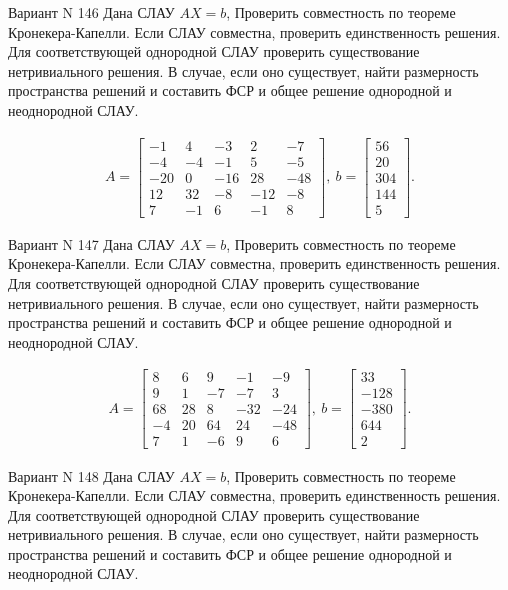 \documentclass[11pt]{report}
\begin{document}
Вариант N 146
Дана СЛАУ $AX = b$,
Проверить совместность по теореме Кронекера-Капелли. Если СЛАУ совместна, проверить единственность решения.
Для соответствующей однородной СЛАУ проверить существование нетривиального решения. В случае, если оно существует,
найти размерность пространства решений и составить ФСР и общее решение однородной  и неоднородной СЛАУ.


\begin{align*}
 A = \left[\begin{matrix}-1 & 4 & -3 & 2 & -7\\-4 & -4 & -1 & 5 & -5\\-20 & 0 & -16 & 28 & -48\\12 & 32 & -8 & -12 & -8\\7 & -1 & 6 & -1 & 8\end{matrix}\right],
\ b = \left[\begin{matrix}56\\20\\304\\144\\5\end{matrix}\right]. 
 \end{align*}

Вариант N 147
Дана СЛАУ $AX = b$,
Проверить совместность по теореме Кронекера-Капелли. Если СЛАУ совместна, проверить единственность решения.
Для соответствующей однородной СЛАУ проверить существование нетривиального решения. В случае, если оно существует,
найти размерность пространства решений и составить ФСР и общее решение однородной  и неоднородной СЛАУ.


\begin{align*}
 A = \left[\begin{matrix}8 & 6 & 9 & -1 & -9\\9 & 1 & -7 & -7 & 3\\68 & 28 & 8 & -32 & -24\\-4 & 20 & 64 & 24 & -48\\7 & 1 & -6 & 9 & 6\end{matrix}\right],
\ b = \left[\begin{matrix}33\\-128\\-380\\644\\2\end{matrix}\right]. 
 \end{align*}

Вариант N 148
Дана СЛАУ $AX = b$,
Проверить совместность по теореме Кронекера-Капелли. Если СЛАУ совместна, проверить единственность решения.
Для соответствующей однородной СЛАУ проверить существование нетривиального решения. В случае, если оно существует,
найти размерность пространства решений и составить ФСР и общее решение однородной  и неоднородной СЛАУ.
\end{document}
